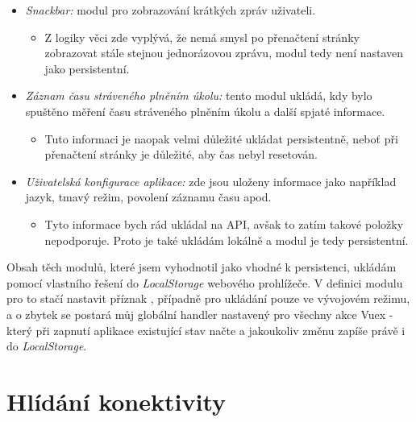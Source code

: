 \begin{itemize}
\begin{itemize}
        \end{itemize}
    \item \emph{Snackbar:} modul pro zobrazování krátkých zpráv uživateli.
        \begin{itemize}
            \item Z logiky věci zde vyplývá, že nemá smysl po přenačtení stránky zobrazovat stále stejnou jednorázovou zprávu, modul tedy není nastaven jako persistentní.
        \end{itemize}
    \item \emph{Záznam času stráveného plněním úkolu:} tento modul ukládá, kdy bylo spuštěno měření času stráveného plněním úkolu a další spjaté informace.
        \begin{itemize}
            \item Tuto informaci je naopak velmi důležité ukládat persistentně, neboť při přenačtení stránky je důležité, aby čas nebyl resetován.
        \end{itemize}
    \item \emph{Uživatelská konfigurace aplikace:} zde jsou uloženy informace jako například jazyk, tmavý režim, povolení záznamu času apod.
        \begin{itemize}
            \item Tyto informace bych rád ukládal na API, avšak to zatím takové položky nepodporuje. Proto je také ukládám lokálně a modul je tedy persistentní.
        \end{itemize}
\end{itemize}

Obsah těch modulů, které jsem vyhodnotil jako vhodné k persistenci, ukládám pomocí vlastního řešení do \emph{LocalStorage} webového prohlížeče. V definici modulu pro to stačí nastavit příznak , případně  pro ukládání pouze ve vývojovém režimu, a o zbytek se postará můj globální handler nastavený pro všechny akce Vuex - který při zapnutí aplikace existující stav načte a jakoukoliv změnu zapíše právě i do \emph{LocalStorage}.


\section{Hlídání konektivity}

